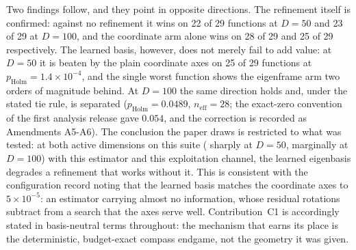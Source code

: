 \documentclass[algorithms,article,submit,moreauthors,pdftex]{Definitions/mdpi}
\begin{document}
\begin{table}[H]
\caption{Refinement-basis contrast on CEC2017 at the two dimensions where the
polish is active.  Paired Wilcoxon signed-rank across the 29 scored functions on
per-function mean error, Holm-corrected within dimension over the registered
two-contrast family; $A_{12}$ over the paired runs of all scored functions
pooled (not the per-function-averaged $A_{12}$ of Section~S6.5), computed with the first-named
arm as reference, so $A_{12} < 0.5$ favors the second; between-function scale
dominates the pooled pairs and compresses the statistic toward $0.5$, so a
value near $0.5$ here does not indicate a null contrast.  W/T/L counts functions with wins
credited to the first-named arm, ties at a tolerance of $10^{-8}$; the same
band is applied before ranking, and
$n_{\mathrm{eff}}$ reports the functions remaining in each ranking
(Amendments A5-A6).  $^{\dagger}$The coordinate-versus-none row is a
supplementary single-test contrast added after verification, outside the registered
family, so its Holm value equals its raw value; it is reported because the value of
the axes endgame would otherwise rest only on a transitive
argument.}\label{tab:rev-e1}
\resizebox{\textwidth}{!}{}
\end{table}

Two findings follow, and they point in opposite directions.  The refinement
itself is confirmed: against no refinement it wins on 22 of 29 functions at
$D = 50$ and 23 of 29 at $D = 100$, and the coordinate arm alone wins on 28 of
29 and 25 of 29 respectively.  The learned basis, however, does not merely fail
to add value: at $D = 50$ it is beaten by the plain coordinate axes on 25 of
29 functions at $p_{\mathrm{Holm}} = 1.4\times10^{-4}$, and the single worst
function shows the eigenframe arm two orders of magnitude behind.  At $D = 100$
the same direction holds and, under the stated tie rule, is separated
($p_{\mathrm{Holm}} = 0.0489$, $n_{\mathrm{eff}} = 28$; the exact-zero
convention of the first analysis release gave $0.054$, and the correction is
recorded as Amendments A5-A6).  The conclusion the paper draws is
restricted to what was tested: at both active dimensions on this suite (%
sharply at $D = 50$, marginally at $D = 100$) with this estimator and
this exploitation channel, the learned eigenbasis degrades a refinement that
works without it.  This is consistent with the configuration record noting that
the learned basis matches the coordinate axes to $5\times10^{-5}$: an
estimator carrying almost no information, whose residual rotations subtract from
a search that the axes serve well.  Contribution~C1 is accordingly stated in
basis-neutral terms throughout: the mechanism that earns its place is the
deterministic, budget-exact compass endgame, not the geometry it was given.
\end{document}
